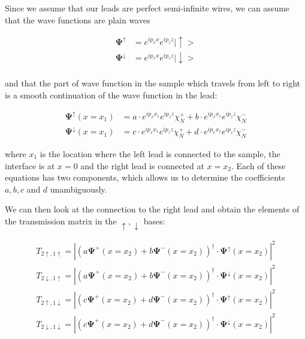 
Since we assume that our leads are perfect semi-infinite wires, we can assume
that the wave functions are plain waves

\begin{align*}
    \mathbf{\Psi^\uparrow}   &=  e^{i p_x x} e^{i p_z z} |\uparrow> \\
    \mathbf{\Psi^\downarrow} &=  e^{i p_x x} e^{i p_z z} |\downarrow> \\
\end{align*}

and that the part of wave function in the sample which travels from left to
right is a smooth continuation of the wave function in the lead:

\begin{align}
    \mathbf{\Psi^\uparrow}(x=x_1) &=
        a\cdot e^{i p_x x_1}e^{i p_z z} \chi_N^+
        + b\cdot e^{i p_x x_1}e^{i p_z z} \chi_N^-\nonumber\\
    \mathbf{\Psi^\downarrow}(x=x_1) &=
        c\cdot e^{i p_x x_1}e^{i p_z z} \chi_N^+
        + d\cdot e^{i p_x x_1}e^{i p_z z} \chi_N^-
        \label{eq:a-n-left}
\end{align}

where $x_1$ is the location where the left lead is connected to the sample, the
interface is at $x = 0$ and the right lead is connected at $x = x_2$.
Each of these equations has two components, which allows us to determine
the coefficients $a, b, c$ and $d$ unambiguously.


We can then look at the connection to the right lead and obtain the 
elements of the transmission matrix in the $\uparrow, \downarrow$ bases:

\begin{align}
    T_{2\uparrow,1\uparrow} = \left| \left( 
        a \mathbf{\Psi^+}(x=x_2) + b  \mathbf{\Psi^-}(x=x_2)
    \right)^\dagger \cdot \mathbf{\Psi}^\uparrow(x=x_2) \right|^2\nonumber\\
    T_{2\downarrow,1\uparrow} = \left| \left( 
        a \mathbf{\Psi^+}(x=x_2) + b  \mathbf{\Psi^-}(x=x_2)
    \right)^\dagger \cdot \mathbf{\Psi}^\downarrow(x=x_2) \right|^2\nonumber\\
    T_{2\uparrow,1\downarrow} = \left| \left( 
        c \mathbf{\Psi^+}(x=x_2) + d  \mathbf{\Psi^-}(x=x_2)
    \right)^\dagger \cdot \mathbf{\Psi}^\uparrow(x=x_2) \right|^2\nonumber\\
    T_{2\downarrow,1\downarrow} = \left| \left( 
        c \mathbf{\Psi^+}(x=x_2) + d  \mathbf{\Psi^-}(x=x_2)
    \right)^\dagger \cdot \mathbf{\Psi}^\downarrow(x=x_2) \right|^2
\end{align}


